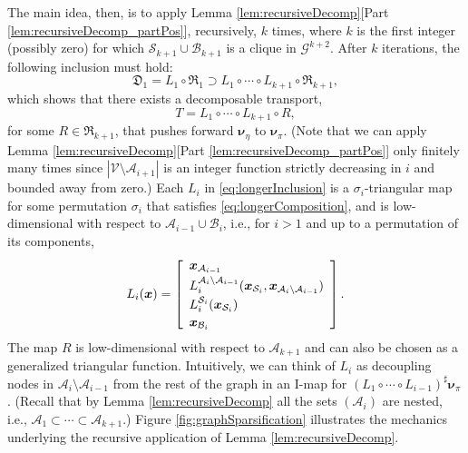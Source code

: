 \documentclass[twoside,11pt]{article}
\newcommand{\genm}{\boldsymbol{\nu} }   %
\newcommand{\Bc}{\mathcal{B}}
\newcommand{\Vc}{\mathcal{V}}
\newcommand{\Ac}{\mathcal{A}}
\newcommand{\Sc}{\mathcal{S}}
\newcommand{\xb}{\boldsymbol{x}}
\newcommand{\Gcb}{\boldsymbol{\mathcal{G}}}
\newcommand{\lmap}{L} %
\newcommand{\decset}{\mathfrak{D}} %
\newcommand{\Aset}{ \Ac }
\newcommand{\Bset}{ \Bc }
\newcommand{\Sset}{ \Sc }
\newcommand{\pull}{^\sharp}
\begin{document}
%
The main idea, then, is to apply
Lemma \ref{lem:recursiveDecomp}[Part \ref{lem:recursiveDecomp_partPos}], recursively, 
%
$k$ times, where $k$ is the first integer (possibly zero) for which
$\Sset_{k+1} \cup \Bset_{k+1}$ is a clique in 
%
%
$\Gcb^{k+2}$. %
After $k$ iterations, the following
inclusion must hold:
%
\begin{equation} \label{eq:longerInclusion}
  \decset_1 = \lmap_1 \circ \mathfrak{R}_1 \supset
  \lmap_1 \circ \cdots \circ \lmap_{k+1} \circ \mathfrak{R}_{k+1},
\end{equation}
which shows that there
exists a decomposable transport,
\begin{equation} \label{eq:longerComposition}
T=\lmap_1 \circ \cdots \circ \lmap_{k+1} \circ R, 
\end{equation}
for some $R \in \mathfrak{R}_{k+1}$, that pushes forward $\genm_\eta$ to $\genm_\pi$.
(Note that we can  apply 
Lemma \ref{lem:recursiveDecomp}[Part \ref{lem:recursiveDecomp_partPos}] 
only finitely many times 
since $|\Vc \setminus \Aset_{i+1}|$ is an integer function strictly
decreasing in $i$ and 
bounded away from zero.)
Each $\lmap_i$ in \eqref{eq:longerInclusion} 
is a $\sigma_i$-triangular map for some permutation $\sigma_i$
that satisfies \eqref{eq:longerComposition}, and is low-dimensional with respect to 
$\Aset_{i-1} \cup \Bset_{i}$, i.e., for $i>1$ and up
to a permutation of its components,
%
%
\begin{equation}  
\lmap_i( \xb ) = \left[\begin{array}{l}
\xb_{\Aset_{i-1}} \\[\spacinglines] 
\lmap_i^{\Aset_{i} \setminus \Aset_{i-1}}( \xb_{\Sset_i} , \xb_{\Aset_{i} \setminus \Aset_{i-1}} )\\[\spacinglines] 
\lmap_i^{\Sset_i}(\xb_{\Sset_i})\\[\spacinglines] 
\xb_{\Bset_i} 
\end{array}\right].
\end{equation}
%
%
The map $R$ is low-dimensional with respect to
$\Aset_{k+1}$ and can also be chosen as a generalized triangular function.
Intuitively, we can think of $\lmap_i$ as
decoupling nodes in $\Aset_i\setminus \Aset_{i-1}$ 
from the rest of the graph in an I-map for 
$(\lmap_1 \circ\cdots\circ \lmap_{i-1})\pull \genm_\pi$.
(Recall that by Lemma \ref{lem:recursiveDecomp} all the sets $(\Aset_i)$ are nested, i.e.,
$\Aset_1 \subset \cdots  \subset \Aset_{k+1}$.)
Figure \ref{fig:graphSparsification} 
illustrates the mechanics underlying the recursive application of 
Lemma \ref{lem:recursiveDecomp}.
%
%
\end{document}
